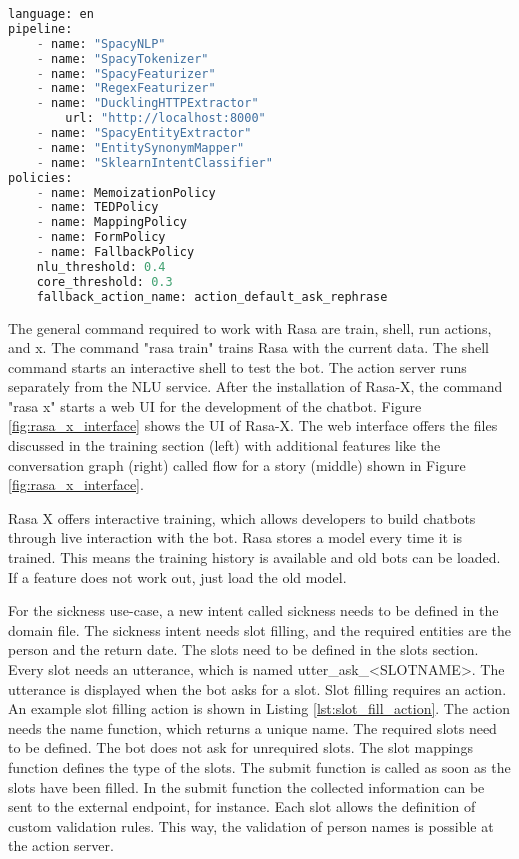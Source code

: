 \begin{lstlisting}[caption={Rasa Configuration}, label={lst:rasa_config},captionpos=b,frame=single,language={Python},commentstyle=\color{mygreen},keywordstyle=\color{blue},
    morekeywords={language, pipeline, policies, name}]                
language: en
pipeline: 
    - name: "SpacyNLP"
    - name: "SpacyTokenizer"
    - name: "SpacyFeaturizer"
    - name: "RegexFeaturizer"
    - name: "DucklingHTTPExtractor"
        url: "http://localhost:8000"
    - name: "SpacyEntityExtractor"
    - name: "EntitySynonymMapper"
    - name: "SklearnIntentClassifier"
policies:
    - name: MemoizationPolicy
    - name: TEDPolicy
    - name: MappingPolicy
    - name: FormPolicy
    - name: FallbackPolicy
    nlu_threshold: 0.4
    core_threshold: 0.3
    fallback_action_name: action_default_ask_rephrase
\end{lstlisting} 
The general command required to work with Rasa are train, shell, run actions, and x.
The command "rasa train" trains Rasa with the current data.
The shell command starts an interactive shell to test the bot.
The action server runs separately from the NLU service.
After the installation of Rasa-X, the command "rasa x" starts a web UI for the development of the chatbot.
Figure \ref{fig:rasa_x_interface} shows the UI of Rasa-X.
The web interface offers the files discussed in the training section (left) with additional features like the conversation graph (right) called flow for a story (middle) shown in Figure \ref{fig:rasa_x_interface}.

Rasa X offers interactive training, which allows developers to build chatbots through live interaction with the bot. 
Rasa stores a model every time it is trained.
This means the training history is available and old bots can be loaded.
If a feature does not work out, just load the old model.

For the sickness use-case, a new intent called sickness needs to be defined in the domain file.
The sickness intent needs slot filling, and the required entities are the 
person and the return date. 
The slots need to be defined in the slots section.
Every slot needs an utterance, which is named utter\_ask\_<SLOTNAME>.
The utterance is displayed when the bot asks for a slot.
Slot filling requires an action.
An example slot filling action is shown in Listing \ref{lst:slot_fill_action}.
The action needs the name function, which returns a unique name.
The required slots need to be defined.
The bot does not ask for unrequired slots.
The slot mappings function defines the type of the slots.
The submit function is called as soon as the slots have been filled.
In the submit function the collected information can be sent to the 
external endpoint, for instance.
Each slot allows the definition of custom validation rules.
This way, the validation of person names is possible at the action server.

